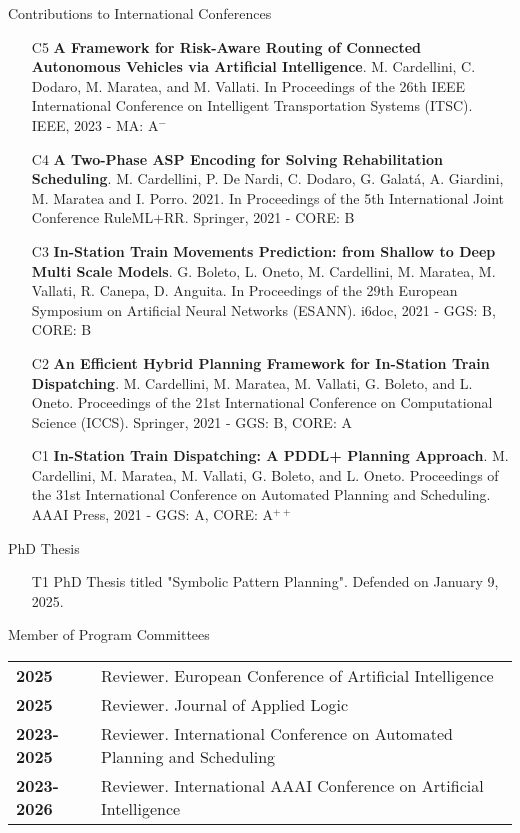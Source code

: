 \documentclass{resume} %
\begin{document}
\begin{rSection}{Contributions to International Conferences}
\begin{enumerate}[leftmargin=5mm]
	\item[C5] \textbf{A Framework for Risk-Aware Routing of Connected Autonomous Vehicles via Artificial Intelligence}. M. Cardellini, C. Dodaro, M. Maratea, and M. Vallati. In Proceedings of the 26th IEEE International Conference on Intelligent Transportation Systems (ITSC). IEEE, 2023 - MA: A$^-$
	
	\item[C4] \textbf{A Two-Phase ASP Encoding for Solving Rehabilitation Scheduling}. M. Cardellini, P. De Nardi, C. Dodaro, G. Galat\'a, A. Giardini, M. Maratea and I. Porro. 2021. In Proceedings of the 5th International Joint Conference RuleML+RR. Springer, 2021 - CORE: B
	
	
	\item[C3] \textbf{In-Station Train Movements Prediction: from Shallow to Deep Multi Scale Models}. G. Boleto, L. Oneto, M. Cardellini, M. Maratea, M. Vallati, R. Canepa, D. Anguita. In Proceedings of the 29th European Symposium on Artificial Neural Networks (ESANN). i6doc, 2021 - GGS: B, CORE: B
	
	\item[C2] \textbf{An Efficient Hybrid Planning Framework for In-Station Train Dispatching}. M. Cardellini, M. Maratea, M. Vallati, G. Boleto, and L. Oneto. Proceedings of the 21st International Conference on Computational Science (ICCS). Springer, 2021 - GGS: B, CORE: A
	
	\item[C1] \textbf{In-Station Train Dispatching: A PDDL+ Planning Approach}. M. Cardellini, M. Maratea, M. Vallati, G. Boleto, and L. Oneto. Proceedings of the 31st International Conference on Automated Planning and Scheduling. AAAI Press, 2021 - GGS: A, CORE: A$^{++}$
\end{enumerate}
\end{rSection}

 \begin{rSection}{PhD Thesis}
  \begin{enumerate}[leftmargin=5mm]
	\item[T1] PhD Thesis titled "Symbolic Pattern Planning". Defended on January 9, 2025.	
	\end{enumerate}
 \end{rSection}
 
 
  \begin{rSection}{Member of Program Committees}
	\begin{tabularx}{0.95\textwidth} {lp{14cm}}
 \textbf{2025} & Reviewer. European Conference of Artificial Intelligence \\
 \textbf{2025} & Reviewer. Journal of Applied Logic \\
 \textbf{2023-2025} & Reviewer. International Conference on Automated Planning and Scheduling \\
 \textbf{2023-2026} & Reviewer. International AAAI Conference on Artificial Intelligence 
  \end{tabularx}
 \end{rSection}
 
\end{document}
